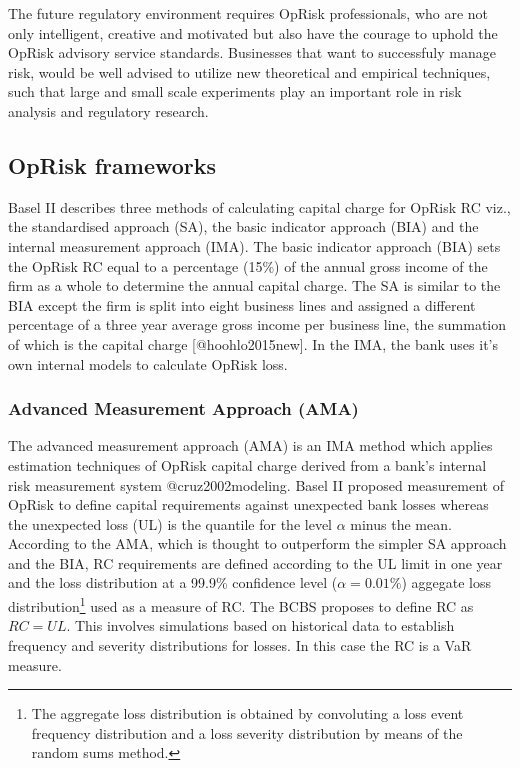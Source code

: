 \documentclass[]{article}
\let\rmarkdownfootnote\footnote%
\def\footnote{\protect\rmarkdownfootnote}
\begin{document}
The future regulatory environment requires OpRisk professionals, who are
not only intelligent, creative and motivated but also have the courage
to uphold the OpRisk advisory service standards. Businesses that want to
successfuly manage risk, would be well advised to utilize new
theoretical and empirical techniques, such that large and small scale
experiments play an important role in risk analysis and regulatory
research.

\subsection{OpRisk frameworks}

Basel II describes three methods of calculating capital charge for
OpRisk RC viz., the standardised approach (SA), the basic indicator
approach (BIA) and the internal measurement approach (IMA). The basic
indicator approach (BIA) sets the OpRisk RC equal to a percentage (15\%)
of the annual gross income of the firm as a whole to determine the
annual capital charge. The SA is similar to the BIA except the firm is
split into eight business lines and assigned a different percentage of a
three year average gross income per business line, the summation of
which is the capital charge {[}@hoohlo2015new{]}. In the IMA, the bank
uses it's own internal models to calculate OpRisk loss.\medskip

\subsubsection{Advanced Measurement Approach (AMA)}

The advanced measurement approach (AMA) is an IMA method which applies
estimation techniques of OpRisk capital charge derived from a bank's
internal risk measurement system @cruz2002modeling. Basel II proposed
measurement of OpRisk to define capital requirements against unexpected
bank losses whereas the unexpected loss (UL) is the quantile for the
level \(\alpha\) minus the mean. According to the AMA, which is thought
to outperform the simpler SA approach and the BIA, RC requirements are
defined according to the UL limit in one year and the loss distribution
at a 99.9\% confidence level (\(\alpha = 0.01\%\)) aggegate loss
distribution\footnote{The aggregate loss distribution is obtained by convoluting a loss event frequency distribution and a loss severity distribution by means of the random sums method.}
used as a measure of RC. The BCBS proposes to define RC as \(RC = UL\).
This involves simulations based on historical data to establish
frequency and severity distributions for losses. In this case the RC is
a VaR measure.\medskip
\end{document}
